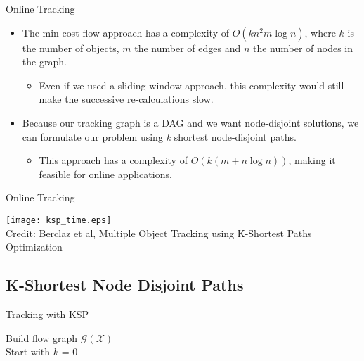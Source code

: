 \begin{frame}{Online Tracking}
	\begin{itemize}
		\item The min-cost flow approach has a complexity of $O(kn^2m\log n)$, where $k$ is the number of objects, $m$ the number of edges and $n$ the number of nodes in the graph.
		\begin{itemize}
			\item Even if we used a sliding window approach, this complexity would still make the successive re-calculations slow.
		\end{itemize}
		\item Because our tracking graph is a DAG and we want node-disjoint solutions, we can formulate our problem using \textit{k} shortest node-disjoint paths.
		\begin{itemize}
			\item This approach has a complexity of $O(k(m+n\log n))$, making it feasible for online applications.
		\end{itemize}
	\end{itemize}
\end{frame}


\begin{frame}{Online Tracking}
	\begin{center}
		\texttt{[image: ksp\_time.eps]}\\
		{\tiny Credit: Berclaz et al, Multiple Object Tracking using K-Shortest Paths Optimization}
	\end{center}
\end{frame}


\subsection{K-Shortest Node Disjoint Paths}
\begin{frame}{Tracking with KSP}
	\begin{algorithm}[H]
		\vspace{5px}

		\vspace{10px}
		Build flow graph $\mathcal{G}(\mathcal{X})$\\
		Start with $k$ = 0\\
	\end{algorithm}
\end{frame}


